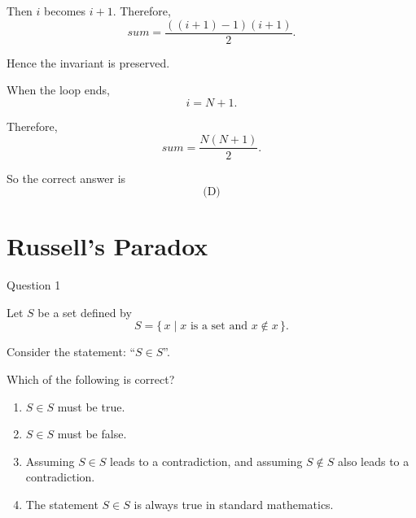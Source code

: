 \documentclass[aspectratio=169,11pt]{beamer}
\begin{document}
\begin{frame}
    \begin{block}
        
Then $i$ becomes $i+1$. Therefore,
$$
sum=\frac{((i+1)-1)(i+1)}{2}.
$$

Hence the invariant is preserved.

When the loop ends,
$$
i=N+1.
$$

Therefore,
$$
sum=\frac{N(N+1)}{2}.
$$

So the correct answer is
$$
\boxed{\text{(D)}}
$$
\end{block}

\end{frame}
\section{Russell's Paradox}
\begin{frame}{Question 1}

Let $S$ be a set defined by
$$
S=\{\,x\mid x\text{ is a set and }x\notin x\,\}.
$$

Consider the statement: ``$S\in S$''.

Which of the following is correct?

\begin{enumerate}
    \item[(A)] $S\in S$ must be true.
    \item[(B)] $S\in S$ must be false.
    \item[(C)] Assuming $S\in S$ leads to a contradiction, and assuming
    $S\notin S$ also leads to a contradiction.
    \item[(D)] The statement $S\in S$ is always true in standard mathematics.
\end{enumerate}

\end{frame}

\end{document}
